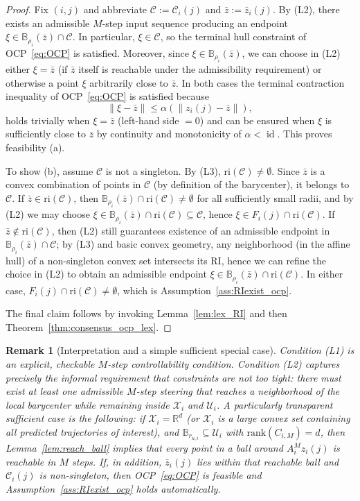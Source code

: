\documentclass[12pt,draftcls,onecolumn]{IEEEtran}
\newtheorem{remark}{Remark}
\def\field#1{\mathbb #1}%
\def\R{\field{R}}%
\def\B{\field{B}}%
\newcommand{\X}{\ensuremath{\mathcal X}}
\newcommand{\U}{\ensuremath{\mathcal U}}
\DeclareMathOperator{\id}{id}
\def\C{\mathcal{C}}
\def\Cij{\mathcal{C}_i (j)}
\def\ri{\mathrm{ri}}
\def\rank{\mathrm{rank}}
\begin{document}
\begin{proof}
Fix $(i,j)$ and abbreviate $\C:=\Cij$ and $\bar z:=\bar z_i(j)$.
By (L2), there exists an admissible $M$-step input sequence producing an endpoint
$\xi\in \B_{\rho_i}(\bar z)\cap \C$. In particular, $\xi\in \C$, so the terminal hull constraint of OCP~\eqref{eq:OCP}
is satisfied. Moreover, since $\xi\in \B_{\rho_i}(\bar z)$, we can choose in (L2) either $\xi=\bar z$ (if
$\bar z$ itself is reachable under the admissibility requirement) or otherwise a point $\xi$ arbitrarily
close to $\bar z$. In both cases the terminal contraction inequality of OCP~\eqref{eq:OCP} is satisfied because
\[
\|\xi-\bar z\| \le \alpha(\|z_i(j)-\bar z\|),
\]
holds trivially when $\xi=\bar z$ (left-hand side $=0$) and can be ensured when $\xi$ is sufficiently
close to $\bar z$ by continuity and monotonicity of $\alpha<\id$. This proves feasibility (a).

To show (b), assume $\C$ is not a singleton. By (L3), $\ri(\C)\neq\emptyset$. Since $\bar z$ is a convex
combination of points in $\C$ (by definition of the barycenter), it belongs to $\C$. If $\bar z\in\ri(\C)$,
then $\B_{\rho_i}(\bar z)\cap \ri(\C)\neq\emptyset$ for all sufficiently small radii, and by (L2) we may
choose $\xi\in \B_{\rho_i}(\bar z)\cap \ri(\C)\subseteq \C$, hence $\xi\in F_i(j)\cap\ri(\C)$.
If $\bar z\notin\ri(\C)$, then (L2) still guarantees existence of an admissible endpoint in
$\B_{\rho_i}(\bar z)\cap \C$; by (L3) and basic convex geometry, any neighborhood (in the affine hull)
of a non-singleton convex set intersects its RI, hence we can refine the choice in (L2)
to obtain an admissible endpoint $\xi\in \B_{\rho_i}(\bar z)\cap \ri(\C)$. In either case,
$F_i(j)\cap\ri(\C)\neq\emptyset$, which is Assumption~\ref{ass:RIexist_ocp}.

The final claim follows by invoking Lemma~\ref{lem:lex_RI} and then Theorem~\ref{thm:consensus_ocp_lex}.
\end{proof}

\begin{remark}[Interpretation and a simple sufficient special case]\label{rem:lti_interpretation}
Condition (L1) is an explicit, checkable $M$-step controllability condition.
Condition (L2) captures precisely the informal requirement that \emph{constraints are not too tight}:
there must exist at least one admissible $M$-step steering that reaches a neighborhood of the
local barycenter while remaining inside $\X_i$ and $\U_i$.
A particularly transparent sufficient case is the following: if $\X_i=\R^d$ (or $\X_i$ is a large convex
set containing all predicted trajectories of interest), and $\B_{r_{u,i}}\subseteq \U_i$ with
$\rank(C_{i,M})=d$, then Lemma~\ref{lem:reach_ball} implies that every point in a ball around
$A_i^M z_i(j)$ is reachable in $M$ steps. If, in addition, $\bar z_i(j)$ lies within that reachable ball
and $\Cij$ is non-singleton, then OCP~\eqref{eq:OCP} is feasible and Assumption~\ref{ass:RIexist_ocp} holds automatically.
\end{remark}
\end{document}
